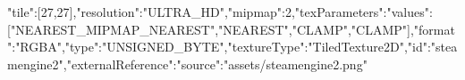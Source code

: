 {"tile":[27,27],"resolution":"ULTRA_HD","mipmap":2,"texParameters":{"values":["NEAREST_MIPMAP_NEAREST","NEAREST","CLAMP","CLAMP"]},"format":"RGBA","type":"UNSIGNED_BYTE","textureType":"TiledTexture2D","id":"steamengine2","externalReference":{"source":"assets/steamengine2.png"}}